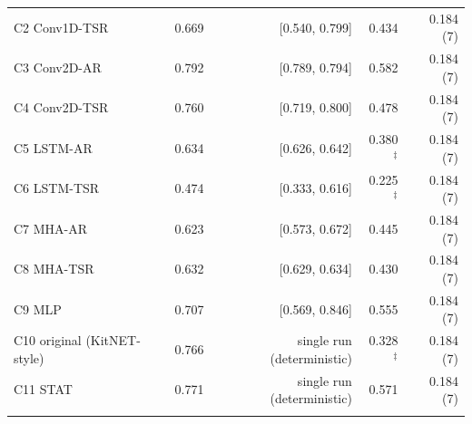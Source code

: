 \begin{longtable}{@{}lrrrr@{}}
\quad C2 Conv1D-TSR & 0.669 & [0.540, 0.799] & 0.434 & 0.184 (7) \\
\quad C3 Conv2D-AR & 0.792 & [0.789, 0.794] & 0.582 & 0.184 (7) \\
\quad C4 Conv2D-TSR & 0.760 & [0.719, 0.800] & 0.478 & 0.184 (7) \\
\quad C5 LSTM-AR & 0.634 & [0.626, 0.642] & 0.380$^{\ddagger}$ & 0.184 (7) \\
\quad C6 LSTM-TSR & 0.474 & [0.333, 0.616] & 0.225$^{\ddagger}$ & 0.184 (7) \\
\quad C7 MHA-AR & 0.623 & [0.573, 0.672] & 0.445 & 0.184 (7) \\
\quad C8 MHA-TSR & 0.632 & [0.629, 0.634] & 0.430 & 0.184 (7) \\
\quad C9 MLP & 0.707 & [0.569, 0.846] & 0.555 & 0.184 (7) \\
\quad C10 original (KitNET-style) & 0.766 & single run (deterministic) & 0.328$^{\ddagger}$ & 0.184 (7) \\
\quad C11 STAT & 0.771 & single run (deterministic) & 0.571 & 0.184 (7) \\
\addlinespace
\end{longtable}
\endgroup
